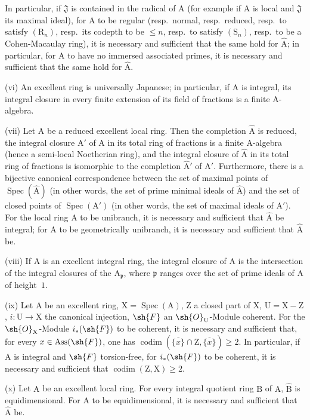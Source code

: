\begin{env}[7.8.3]
In particular, if $\mathfrak{J}$ is contained in the radical of $\mathrm{A}$ (for example if $\mathrm{A}$ is local and $\mathfrak{J}$ its maximal ideal), for $\mathrm{A}$ to be regular (resp.\ normal, resp.\ reduced, resp.\ to satisfy $(\mathrm{R}_n)$, resp.\ its codepth to be $\leqslant n$, resp.\ to satisfy $(\mathrm{S}_n)$, resp.\ to be a Cohen-Macaulay ring), it is necessary and sufficient that the same hold for $\widehat{\mathrm{A}}$; in particular, for $\mathrm{A}$ to have no immersed associated primes, it is necessary and sufficient that the same hold for $\widehat{\mathrm{A}}$.

(vi) An excellent ring is universally Japanese; in particular, if $\mathrm{A}$ is integral, its integral closure in every finite extension of its field of fractions is a finite $\mathrm{A}$-algebra.

(vii) Let $\mathrm{A}$ be a reduced excellent local ring. Then the completion $\widehat{\mathrm{A}}$ is reduced, the integral closure $\mathrm{A}'$ of $\mathrm{A}$ in its total ring of fractions is a finite $\mathrm{A}$-algebra (hence a semi-local Noetherian ring), and the integral closure of $\widehat{\mathrm{A}}$ in its total ring of fractions is isomorphic to the completion $\widehat{\mathrm{A}}'$ of $\mathrm{A}'$. Furthermore, there is a bijective canonical correspondence between the set of maximal points of $\operatorname{Spec}(\widehat{\mathrm{A}})$ (in other words, the set of prime minimal ideals of $\widehat{\mathrm{A}}$) and the set of closed points of $\operatorname{Spec}(\mathrm{A}')$ (in other words, the set of maximal ideals of $\mathrm{A}'$). For the local ring $\mathrm{A}$ to be unibranch, it is necessary and sufficient that $\widehat{\mathrm{A}}$ be integral; for $\mathrm{A}$ to be geometrically unibranch, it is necessary and sufficient that $\widehat{\mathrm{A}}$ be.

(viii) If $\mathrm{A}$ is an excellent integral ring, the integral closure of $\mathrm{A}$ is the intersection of the integral closures of the $\mathrm{A}_\mathfrak{p}$, where $\mathfrak{p}$ ranges over the set of prime ideals of $\mathrm{A}$ of height~$1$.

(ix) Let $\mathrm{A}$ be an excellent ring, $\mathrm{X}=\operatorname{Spec}(\mathrm{A})$, $\mathrm{Z}$ a closed part of $\mathrm{X}$, $\mathrm{U}=\mathrm{X}-\mathrm{Z}$, $i:\mathrm{U}\to\mathrm{X}$ the canonical injection, $\sh{F}$ an $\sh{O}_\mathrm{U}$-Module coherent. For the $\sh{O}_\mathrm{X}$-Module $i_*(\sh{F})$ to be coherent, it is necessary and sufficient that, for every $x\in\operatorname{Ass}(\sh{F})$, one has $\operatorname{codim}(\overline{\{x\}}\cap\mathrm{Z},\overline{\{x\}})\geqslant 2$. In particular, if $\mathrm{A}$ is integral and $\sh{F}$ torsion-free, for $i_*(\sh{F})$ to be coherent, it is necessary and sufficient that $\operatorname{codim}(\mathrm{Z},\mathrm{X})\geqslant 2$.


(x) Let $\mathrm{A}$ be an excellent local ring. For every integral quotient ring $\mathrm{B}$ of $\mathrm{A}$, $\widehat{\mathrm{B}}$ is equidimensional. For $\mathrm{A}$ to be equidimensional, it is necessary and sufficient that $\widehat{\mathrm{A}}$ be.
\end{env}

